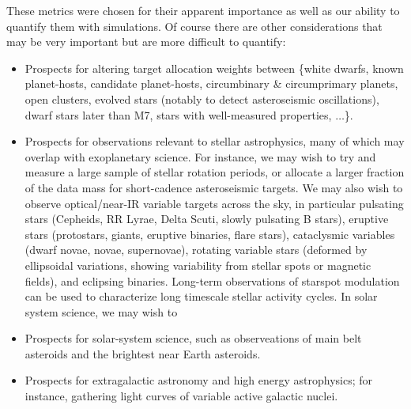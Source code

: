 These metrics were chosen for their apparent importance as well as our
ability to quantify them with simulations. Of course there are other considerations
that may be very important but are more difficult to quantify:
\begin{itemize}
\item Prospects for altering target allocation weights between \{white
  dwarfs, known planet-hosts, candidate planet-hosts, circumbinary \&
  circumprimary planets, open clusters, evolved stars (notably to
  detect asteroseismic oscillations), dwarf stars later than M7, stars
  with well-measured properties, $\ldots$\}.
\item Prospects for observations relevant to stellar astrophysics, many of which may overlap with exoplanetary science.
    For instance, we may wish to try and measure a large sample of stellar rotation periods, or allocate a larger fraction of the data mass for short-cadence asteroseismic targets.
    We may also wish to observe optical/near-IR variable targets across the sky, in particular 
	pulsating stars (Cepheids, RR Lyrae, Delta Scuti, slowly pulsating B stars),
	eruptive stars (protostars, giants, eruptive binaries, flare stars), 
	cataclysmic variables (dwarf novae, novae, supernovae), 
	rotating variable stars (deformed by ellipsoidal variations, showing variability from stellar spots or magnetic fields),
	and eclipsing binaries.
	Long-term observations of starspot modulation can be used to characterize long timescale stellar activity cycles.
	In solar system science, we may wish to 
      \item Prospects for solar-system science, such as observeations of main belt asteroids and the brightest near Earth asteroids.
      \item Prospects for extragalactic astronomy and high energy astrophysics; for instance, gathering light curves of variable active galactic nuclei.
\end{itemize}

